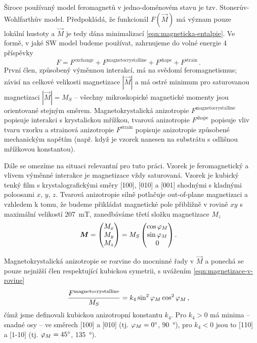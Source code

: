 Široce používaný model feromagnetů v jedno-doménovém stavu je tzv. Stonerův-Wohlfarthův model\cite{stonerMechanismMagneticHysteresis1991}.
Předpokládá, že funkcionál $F(\vec{M})$ má význam pouze lokální hustoty a $\vec{M}$ je tedy dána minimalizací \eqref{eqn:magneticka-entalpie}.
Ve formě, v jaké SW model budeme používat, zahrnujeme do volné energie 4 příspěvky\cite{reichlovaUltrarychlaLaserovaSpektroskopie2010,jandaDynamikaSpinovePolarizace2012,kucharikStudiumSpinovePolarizace2015}
\begin{equation}
    F=F^\textrm{exchange} + F^\textrm{magnetocrystalline} + F^\textrm{shape} + F^\textrm{strain} \,.
\end{equation}
První člen, způsobený výměnnou interakcí, má na svědomí feromagnetismus; závisí na celkové velikosti magnetizace $|\vec{M}|$ a má ostré minimum pro saturovanou magnetizaci $|\vec{M}|=M_S$ -- všechny mikroskopické magnetické momenty jsou orientované stejným směrem.
Magnetokrystalická anizotropie $F^\textrm{magnetocrystalline}$ popisuje interakci s krystalickou mřížkou, tvarová anizotropie $F^\textrm{shape}$ popisuje vliv tvaru vzorku a strainová anizotropie $F^\textrm{strain}$ popisuje anizotropie způsobené mechanickým napětím (např. když je vzorek nanesen na substrátu s odlišnou mřížkovou konstantou).

Dále se omezíme na situaci relevantní pro tuto práci.
Vzorek je feromagnetický a vlivem výměnné interakce je magnetizace vždy saturovaná.
Vzorek je kubický tenký film s krystalografickými směry [100], [010] a [001] shodnými s kladnými poloosami $x$, $y$, $z$.
Tvarová anizotropie silně potlačuje out-of-plane magnetizaci a vzhledem k tomu, že budeme přikládat magnetické pole přibližně v rovině $xy$ s maximální velikostí \SI{207}{\milli\tesla}, zanedbáváme třetí složku magnetizace $M_z$
\begin{equation}
\label{eqn:magnetizace-v-rovine}
    \bm{M}=\begin{pmatrix} M_x \\ M_y \\ M_z \end{pmatrix}
    = M_S \begin{pmatrix} \cos \varphi_M \\ \sin \varphi_M \\ 0 \end{pmatrix} .
\end{equation}

Magnetokrystalická anizotropie se rozvine do mocninné řady v $\vec{M}$ a ponechá se pouze nejnižší člen respektující kubickou symetrii, s uvážením \eqref{eqn:magnetizace-v-rovine}
\begin{equation}
    \frac{F^\textrm{magnetocrystalline}}{M_S}=k_4 \sin^2 \varphi_M \cos^2 \varphi_M \,,
\end{equation}
čímž jsme definovali kubickou anizotropní konstantu $k_4$.
Pro $k_4>0$ má minima -- snadné osy -- ve směrech [100] a [010] (tj. $\varphi_M=\SI{0}{\degree}$, \SI{90}{\degree}), pro $k_4<0$ jsou to [110] a [1-10] (tj. $\varphi_M=\SI{45}{\degree}$, \SI{135}{\degree}).


